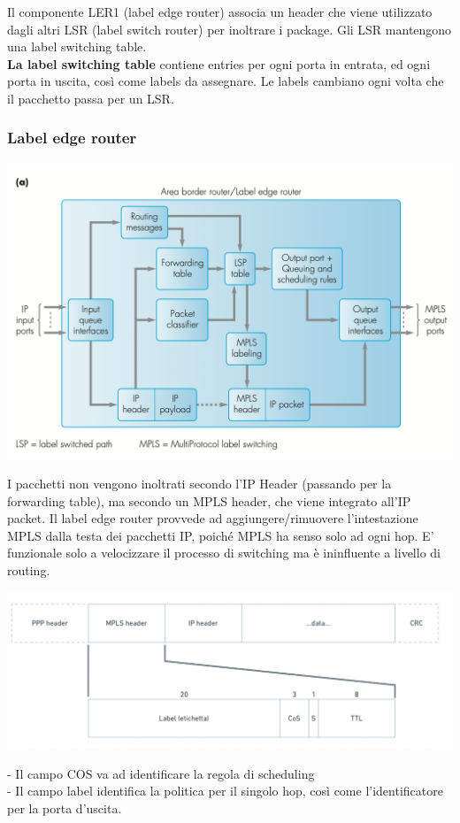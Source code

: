 \documentclass[11pt, oneside]{article}   	%
\begin{document}
Il componente LER1 (label edge router) associa un header che viene utilizzato dagli altri LSR (label switch router) per inoltrare i package. Gli LSR mantengono una label switching table. \\
\textbf{La label switching table} contiene entries per ogni porta in entrata, ed ogni porta in uscita, così come labels da assegnare. Le labels cambiano ogni volta che il pacchetto passa per un LSR.
\subsubsection*{Label edge router}
\begin{center}
\includegraphics[scale=0.5]{et1}\\ 
\end{center}
I pacchetti non vengono inoltrati secondo l'IP Header (passando per la forwarding table), ma secondo un MPLS header, che viene integrato all'IP packet. Il label edge router provvede ad aggiungere/rimuovere l'intestazione MPLS dalla testa dei pacchetti IP, poiché MPLS ha senso solo ad ogni hop. E' funzionale solo a velocizzare il processo di switching ma è ininfluente a livello di routing.
\begin{center}
\includegraphics[scale=0.5]{newlabel}\\ 
\end{center}
- Il campo COS va ad identificare la regola di scheduling\\
- Il campo label identifica la politica per il singolo hop, così come l'identificatore per la porta d'uscita.
\end{document}
